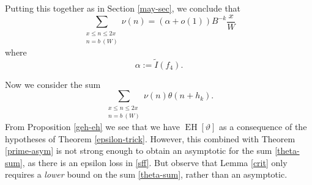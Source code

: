 \documentclass{bmcart}
\DeclareMathOperator*\EH{EH}
\theoremstyle{plain}
\theoremstyle{definition}
\begin{document}
Putting this together as in Section \ref{may-sec}, we conclude that
$$ \sum_{\substack{x \leq n \leq 2x\\ n = b\ (W)}} \nu(n) = (\alpha + o(1)) B^{-k} \frac{x}{W}$$
where 
$$ \alpha := \tilde I(f_4).$$

Now we consider the sum
\begin{equation}\label{theta-sum}
 \sum_{\substack{x \leq n \leq 2x\\ n = b\ (W)}} \nu(n) \theta(n+h_k).
\end{equation}
From Proposition \ref{geh-eh} we see that we have $\EH[\vartheta]$ as a consequence of the hypotheses of Theorem \ref{epsilon-trick}.  However, this combined with Theorem \ref{prime-asym} is not strong enough to obtain an asymptotic for the sum \eqref{theta-sum}, as there is an epsilon loss in \eqref{sff}.  But observe that Lemma \ref{crit} only requires a \emph{lower} bound on the sum \eqref{theta-sum}, rather than an asymptotic. 
\end{document}
